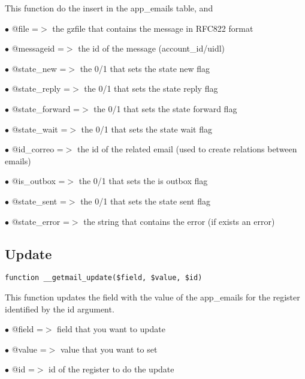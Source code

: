 \documentclass[a4paper]{book}
\begin{document}
This function do the insert in the app\_emails table, and

\begin{compactitem}
\item[\color{myblue}$\bullet$] @file          =$>$ the gzfile that contains the message in RFC822 format
\item[\color{myblue}$\bullet$] @messageid     =$>$ the id of the message (account\_id/uidl)
\item[\color{myblue}$\bullet$] @state\_new     =$>$ the 0/1 that sets the state new flag
\item[\color{myblue}$\bullet$] @state\_reply   =$>$ the 0/1 that sets the state reply flag
\item[\color{myblue}$\bullet$] @state\_forward =$>$ the 0/1 that sets the state forward flag
\item[\color{myblue}$\bullet$] @state\_wait    =$>$ the 0/1 that sets the state wait flag
\item[\color{myblue}$\bullet$] @id\_correo     =$>$ the id of the related email (used to create relations between emails)
\item[\color{myblue}$\bullet$] @is\_outbox     =$>$ the 0/1 that sets the is outbox flag
\item[\color{myblue}$\bullet$] @state\_sent    =$>$ the 0/1 that sets the state sent flag
\item[\color{myblue}$\bullet$] @state\_error   =$>$ the string that contains the error (if exists an error)
\end{compactitem}

\hypertarget{toc51}{}
\subsection{Update}

\begin{lstlisting}
function __getmail_update($field, $value, $id)
\end{lstlisting}

This function updates the field with the value of the app\_emails for the
register identified by the id argument.

\begin{compactitem}
\item[\color{myblue}$\bullet$] @field =$>$ field that you want to update
\item[\color{myblue}$\bullet$] @value =$>$ value that you want to set
\item[\color{myblue}$\bullet$] @id    =$>$ id of the register to do the update
\end{compactitem}
\end{document}
